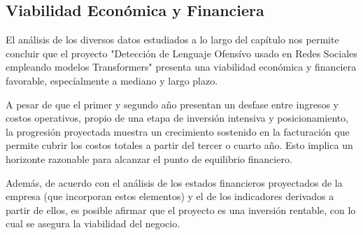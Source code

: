 



\subsection{Viabilidad Económica y Financiera}

El análisis de los diversos datos estudiados a lo largo del capítulo nos permite concluir que el proyecto "Detección de Lenguaje Ofensívo usado en Redes Sociales empleando modelos Transformers" presenta una viabilidad económica y financiera favorable, especíalmente a mediano y largo plazo.

A pesar de que el primer y segundo año presentan un desfase entre ingresos y costos operativos, propio de una etapa de inversión intensiva y posicionamiento, la progresión proyectada muestra un crecimiento sostenido en la facturación que permite cubrir los costos totales a partir del tercer o cuarto año. Esto implica un horizonte razonable para alcanzar el punto de equilibrio financiero.

Además, de acuerdo con el análisis de los estados financieros proyectados de la empresa (que incorporan estos elementos) y el de los indicadores derivados a partir de ellos, es posible afirmar que el proyecto es una inversión rentable, con lo cual se asegura la viabilidad del negocio.
